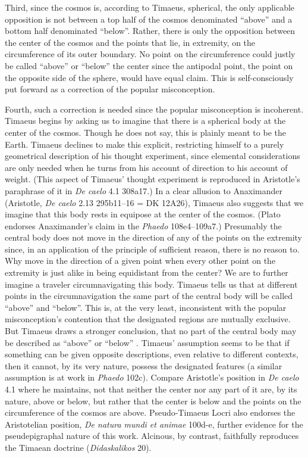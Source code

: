 Third, since the cosmos is, according to Timaeus, spherical, the only applicable opposition is not between a top half of the cosmos denominated ``above'' and a bottom half denominated ``below''. Rather, there is only the opposition between the center of the cosmos and the points that lie, in extremity, on the circumference of its outer boundary. No point on the circumference could justly be called ``above'' or ``below'' the center since the antipodal point, the point on the opposite side of the sphere, would have equal claim. This is self-consciously put forward as a correction of the popular misconception.

Fourth, such a correction is needed since the popular misconception is incoherent. Timaeus begins by asking us to imagine that there is a spherical body at the center of the cosmos. Though he does not say, this is plainly meant to be the Earth. Timaeus declines to make this explicit, restricting himself to a purely geometrical description of his thought experiment, since elemental considerations are only needed when he turns from his account of direction to his account of weight. (This aspect of Timaeus' thought experiment is reproduced in Aristotle's paraphrase of it in \emph{De caelo} 4.1 308a17.) In a clear allusion to Anaximander (Aristotle, \emph{De caelo} 2.13 295b11--16 = DK 12A26), Timaeus also suggests that we imagine that this body rests in equipose at the center of the cosmos. (Plato endorses Anaximander's claim in the \emph{Phaedo} 108e4--109a7.) Presumably the central body does not move in the direction of any of the points on the extremity since, in an application of the principle of sufficient reason, there is no reason to. Why move in the direction of a given point when every other point on the extremity is just alike in being equidistant from the center? We are to further imagine a traveler circumnavigating this body. Timaeus tells us that at different points in the circumnavigation the same part of the central body will be called ``above'' and ``below''. This is, at the very least, inconsistent with the popular misconception's contention that the designated regions are mutually exclusive. But Timaeus draws a stronger conclusion, that no part of the central body may be described as ``above'' or ``below'' \citep[23--24]{OBrien:1984ji}. Timaeus' assumption seems to be that if something can be given opposite descriptions, even relative to different contexts, then it cannot, by its very nature, possess the designated features (a similar assumption is at work in \emph{Phaedo} 102c). Compare Aristotle's position in \emph{De caelo} 4.1 where he maintains, not that neither the center nor any part of it are, by its nature, above or below, but rather that the center is below and the points on the circumference of the cosmos are above. Pseudo-Timaeus Locri also endorses the Aristotelian position, \emph{De natura mundi et animae} 100d-e, further evidence for the pseudepigraphal nature of this work. Alcinous, by contrast, faithfully reproduces the Timaean doctrine (\emph{Didaskalikos} 20).

